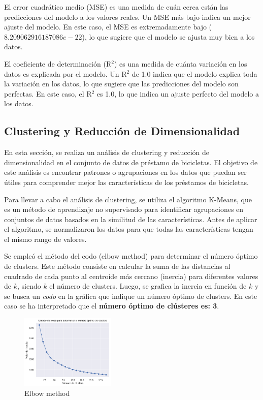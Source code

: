 \documentclass{wsdcr}
\begin{document}
El error cuadrático medio (MSE) es una medida de cuán cerca están las predicciones del modelo a los valores reales. Un MSE más bajo indica un mejor ajuste del modelo. En este caso, el MSE es extremadamente bajo ($8.209062916187086e-22$), lo que sugiere que el modelo se ajusta muy bien a los datos.

El coeficiente de determinación (R$^2$) es una medida de cuánta variación en los datos es explicada por el modelo. Un R$^2$ de 1.0 indica que el modelo explica toda la variación en los datos, lo que sugiere que las predicciones del modelo son perfectas. En este caso, el R$^2$ es 1.0, lo que indica un ajuste perfecto del modelo a los datos.

\subsection{Clustering y Reducción de Dimensionalidad}

En esta sección, se realiza un análisis de clustering y reducción de dimensionalidad en el conjunto de datos de préstamo de bicicletas. El objetivo de este análisis es encontrar patrones o agrupaciones en los datos que puedan ser útiles para comprender mejor las características de los préstamos de bicicletas.

Para llevar a cabo el análisis de clustering, se utiliza el algoritmo K-Means, que es un método de aprendizaje no supervisado para identificar agrupaciones en conjuntos de datos basados en la similitud de las características. Antes de aplicar el algoritmo, se normalizaron los datos para que todas las características tengan el mismo rango de valores.

Se empleó el método del codo (elbow method) para determinar el número óptimo de clusters. Este método consiste en calcular la suma de las distancias al cuadrado de cada punto al centroide más cercano (inercia) para diferentes valores de $k$, siendo $k$ el número de clusters. Luego, se grafica la inercia en función de $k$ y se busca un \textit{codo} en la gráfica que indique un número óptimo de clusters. En este caso se ha interpretado que el \textbf{número óptimo de clústeres es: 3}.

\begin{figure}[h]
    \centering
    \includegraphics[width=0.4\textwidth]{charts/elbow_method_optimum_value.png}
    \caption{Elbow method}
    \label{fig:elbowmethod}
\end{figure}
\end{document}
